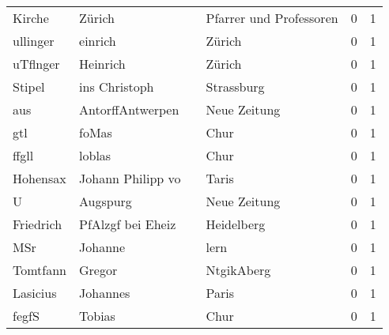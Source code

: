 \documentclass[10pt,a4paper,landscape]{article}
\begin{document}
\begin{longtable}{llllrr}
                   Kirche &                             Zürich &             &                     Pfarrer und Professoren &          0 &         1 \\
                 ullinger &                            einrich &             &                                      Zürich &          0 &         1 \\
                 uTflnger &                           Heinrich &             &                                      Zürich &          0 &         1 \\
                   Stipel &                      ins Christoph &             &                                  Strassburg &          0 &         1 \\
                      aus &                   AntorffAntwerpen &             &                                Neue Zeitung &          0 &         1 \\
                      gtl &                              foMas &             &                                        Chur &          0 &         1 \\
                    ffgll &                             loblas &             &                                        Chur &          0 &         1 \\
                 Hohensax &                  Johann Philipp vo &             &                                       Taris &          0 &         1 \\
                        U &                           Augspurg &             &                                Neue Zeitung &          0 &         1 \\
                Friedrich &                  PfAlzgf bei Eheiz &             &                                  Heidelberg &          0 &         1 \\
                      MSr &                            Johanne &             &                                        lern &          0 &         1 \\
                 Tomtfann &                             Gregor &             &                                  NtgikAberg &          0 &         1 \\
                 Lasicius &                           Johannes &             &                                       Paris &          0 &         1 \\
                    fegfS &                             Tobias &             &                                        Chur &          0 &         1 \\

\end{longtable}
\end{document}
